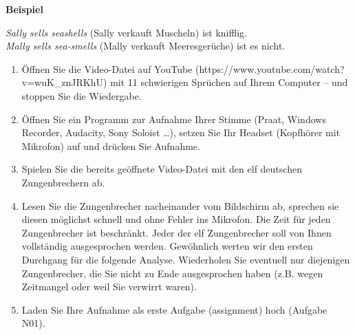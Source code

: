 \documentclass[
  letterpaper,
]{scrbook}
\providecommand{\tightlist}{%
  \setlength{\itemsep}{0pt}\setlength{\parskip}{0pt}}\usepackage{longtable,booktabs,array}
\begin{document}
\begin{tcolorbox}[enhanced jigsaw, colframe=quarto-callout-note-color-frame, toprule=.15mm, opacityback=0, rightrule=.15mm, colback=white, leftrule=.75mm, breakable, arc=.35mm, bottomrule=.15mm, left=2mm]
\begin{minipage}[t]{5.5mm}
\textcolor{quarto-callout-note-color}{\faInfo}
\end{minipage}%
\begin{minipage}[t]{\textwidth - 5.5mm}

\textbf{Beispiel}\vspace{2mm}

\emph{Sally sells seashells} (Sally verkauft Muscheln) ist knifflig.\\
\emph{Mally sells sea-smells} (Mally verkauft Meeresgerüche) ist es
nicht.

\end{minipage}%
\end{tcolorbox}

\begin{enumerate}
\def\labelenumi{\arabic{enumi}.}
\tightlist
\item
  Öffnen Sie die Video-Datei auf YouTube
  (https://www.youtube.com/watch?v=wuK\_znJRKhU) mit 11 schwierigen
  Sprüchen auf Ihrem Computer -- und stoppen Sie die Wiedergabe.\\
\item
  Öffnen Sie ein Programm zur Aufnahme Ihrer Stimme (Praat, Windows
  Recorder, Audacity, Sony Soloist \ldots), setzen Sie Ihr Headset
  (Kopfhörer mit Mikrofon) auf und drücken Sie Aufnahme.\\
\item
  Spielen Sie die bereits geöffnete Video-Datei mit den elf deutschen
  Zungenbrechern ab.\\
\item
  Lesen Sie die Zungenbrecher nacheinander vom Bildschirm ab, sprechen
  sie diesen möglichst schnell und ohne Fehler ins Mikrofon. Die Zeit
  für jeden Zungenbrecher ist beschränkt. Jeder der elf Zungenbrecher
  soll von Ihnen vollständig ausgesprochen werden. Gewöhnlich werten wir
  den ersten Durchgang für die folgende Analyse. Wiederholen Sie
  eventuell nur diejenigen Zungenbrecher, die Sie nicht zu Ende
  ausgesprochen haben (z.B. wegen Zeitmangel oder weil Sie verwirrt
  waren).\\
\item
  Laden Sie Ihre Aufnahme als erste Aufgabe (assignment) hoch (Aufgabe
  N01).\\
\end{enumerate}
\end{document}
